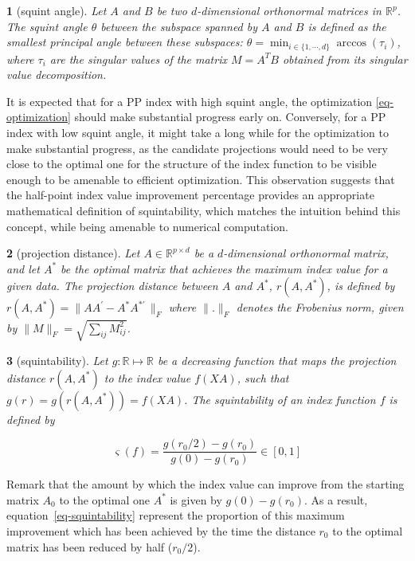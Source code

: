 \documentclass[
  12pt,
]{interact}
\theoremstyle{plain}
\newtheorem{defn}{\protect\definitionname}
\providecommand{\definitionname}{Definition}
\begin{document}
\begin{defn}[squint angle]\label{def:squint-angle}
Let $A$ and $B$ be two $d$-dimensional orthonormal matrices in $\mathbb{R}^p$. The squint angle $\theta$ between the subspace spanned by $A$ and $B$ is defined as the smallest principal angle between these subspaces: $\theta = \min_{i \in \{1, \cdots, d\}} \arccos(\tau_i)$, where $\tau_i$ are the singular values of the matrix $M = A^T B$ obtained from its singular value decomposition.
\end{defn}

It is expected that for a PP index with high squint angle, the
optimization \eqref{eq-optimization} should make substantial progress
early on. Conversely, for a PP index with low squint angle, it might
take a long while for the optimization to make substantial progress, as
the candidate projections would need to be very close to the optimal one
for the structure of the index function to be visible enough to be
amenable to efficient optimization. This observation suggests that the
half-point index value improvement percentage provides an appropriate
mathematical definition of squintability, which matches the intuition
behind this concept, while being amenable to numerical computation.

\begin{defn}[projection distance]\label{def:proj-dist}
Let $A \in \mathbb{R}^{p \times d}$ be a $d$-dimensional orthonormal matrix, and let $A^*$ be the optimal matrix that achieves the maximum index value for a given data. The projection distance between $A$ 
and $A^*$, $r(A, A^*)$, is defined by
$r(A, A^*) = \lVert AA^\prime - A^*A^{*\prime}\,\rVert _F$
where $\lVert . \rVert _F$ denotes the Frobenius norm, given by
$\lVert M \rVert _F = \sqrt{\sum_{ij} M_{ij}^2}$. 
\end{defn}
\begin{defn}[squintability]\label{def:squintability}
Let $g: \mathbb{R} \mapsto  \mathbb{R}$ be a decreasing function that maps the projection distance $r(A, A^*)$ to the index value $f(XA)$, such that $g(r) = g(r(A, A^*)) = f(XA)$.  The squintability of an index function $f$ is defined by 

\begin{equation}
\varsigma(f) = \frac{g(r_{0}/2)-g(r_{0})}{g(0)-g(r_{0})} \in [0,1]
\label{eq-squintability}
\end{equation}

\end{defn}

Remark that the amount by which the index value can improve from the
starting matrix \(A_0\) to the optimal one \(A^*\) is given by
\(g(0)-g(r_{0})\). As a result, equation~\eqref{eq-squintability}
represent the proportion of this maximum improvement which has been
achieved by the time the distance \(r_0\) to the optimal matrix has been
reduced by half (\(r_0/2\)).
\end{document}
